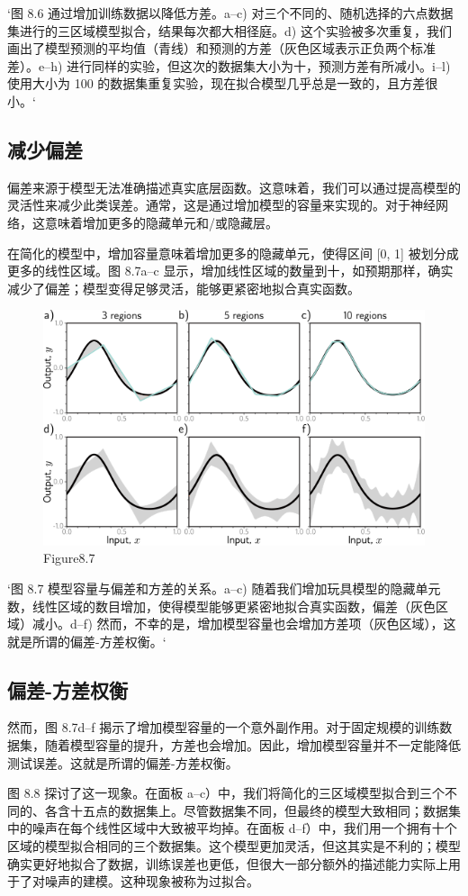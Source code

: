 `图 8.6 通过增加训练数据以降低方差。a–c) 对三个不同的、随机选择的六点数据集进行的三区域模型拟合，结果每次都大相径庭。d) 这个实验被多次重复，我们画出了模型预测的平均值（青线）和预测的方差（灰色区域表示正负两个标准差）。e–h) 进行同样的实验，但这次的数据集大小为十，预测方差有所减小。i–l) 使用大小为 100 的数据集重复实验，现在拟合模型几乎总是一致的，且方差很小。`

\subsection{减少偏差}
偏差来源于模型无法准确描述真实底层函数。这意味着，我们可以通过提高模型的灵活性来减少此类误差。通常，这是通过增加模型的容量来实现的。对于神经网络，这意味着增加更多的隐藏单元和/或隐藏层。

在简化的模型中，增加容量意味着增加更多的隐藏单元，使得区间 [0, 1] 被划分成更多的线性区域。图 8.7a–c 显示，增加线性区域的数量到十，如预期那样，确实减少了偏差；模型变得足够灵活，能够更紧密地拟合真实函数。

\begin{figure}[h!]
\centering
\includegraphics[width=0.7\linewidth]{png/chapter8/PerfBias.png}
\caption{Figure8.7}
\end{figure}

`图 8.7 模型容量与偏差和方差的关系。a–c) 随着我们增加玩具模型的隐藏单元数，线性区域的数目增加，使得模型能够更紧密地拟合真实函数，偏差（灰色区域）减小。d–f) 然而，不幸的是，增加模型容量也会增加方差项（灰色区域），这就是所谓的偏差-方差权衡。`
\subsection{偏差-方差权衡}
然而，图 8.7d–f 揭示了增加模型容量的一个意外副作用。对于固定规模的训练数据集，随着模型容量的提升，方差也会增加。因此，增加模型容量并不一定能降低测试误差。这就是所谓的偏差-方差权衡。

图 8.8 探讨了这一现象。在面板 a–c）中，我们将简化的三区域模型拟合到三个不同的、各含十五点的数据集上。尽管数据集不同，但最终的模型大致相同；数据集中的噪声在每个线性区域中大致被平均掉。在面板 d–f）中，我们用一个拥有十个区域的模型拟合相同的三个数据集。这个模型更加灵活，但这其实是不利的；模型确实更好地拟合了数据，训练误差也更低，但很大一部分额外的描述能力实际上用于了对噪声的建模。这种现象被称为过拟合。

